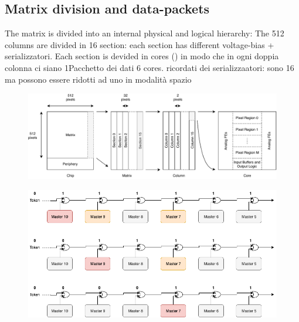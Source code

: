     \subsection{Matrix division and data-packets}
        The matrix is divided into an internal physical and logical hierarchy:
        The 512 columns are divided in 16 section: each section has different voltage-bias + serializzatori.
        Each section is devided in cores () in modo che in ogni doppia colonna ci siano 1Pacchetto dei dati
        6 cores. ricordati dei serializzaatori: sono 16 ma possono essere ridotti ad uno in modalità spazio
        \begin{figure}[h!]
            \centering
            \includegraphics[width=.95\linewidth]{figures/ARCADIA/hierarchy.pdf}
            \caption{}
            \label{fig:hierarchy}
        \end{figure}

        
        \begin{figure}[h!]
            \centering
            \includegraphics[width=.95\linewidth]{figures/ARCADIA/token_chain.png}
            \caption{}
            \label{fig:token_chain}
        \end{figure}


